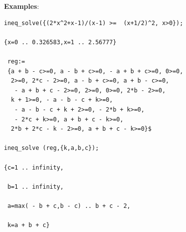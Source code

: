 \noindent
\textbf{Examples}:
\begin{verbatim}
ineq_solve({(2*x^2+x-1)/(x-1) >=  (x+1/2)^2, x>0});

{x=0 .. 0.326583,x=1 .. 2.56777}

 reg:=
 {a + b - c>=0, a - b + c>=0, - a + b + c>=0, 0>=0,
  2>=0, 2*c - 2>=0, a - b + c>=0, a + b - c>=0,
   - a + b + c - 2>=0, 2>=0, 0>=0, 2*b - 2>=0,
  k + 1>=0, - a - b - c + k>=0,
   - a - b - c + k + 2>=0, - 2*b + k>=0,
   - 2*c + k>=0, a + b + c - k>=0,
  2*b + 2*c - k - 2>=0, a + b + c - k>=0}$

ineq_solve (reg,{k,a,b,c});

{c=1 .. infinity,

 b=1 .. infinity,

 a=max( - b + c,b - c) .. b + c - 2,

 k=a + b + c}
\end{verbatim}
